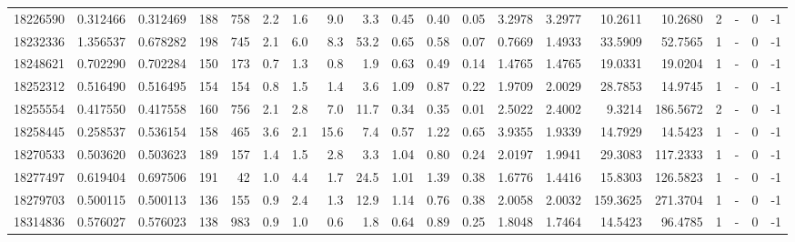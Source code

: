 \begin{tabular}{rrrrrrrrrrrrrrrrrlrl}
  18226590 & 0.312466 &   0.312469 &  188 &  758 &      2.2 &      1.6 &     9.0 &      3.3 &       0.45 &        0.40 &        0.05 &  3.2978 &  3.2977 &   10.2611 &   10.2680 &       2 &             - &        0 &        -1 \\
  18232336 & 1.356537 &   0.678282 &  198 &  745 &      2.1 &      6.0 &     8.3 &     53.2 &       0.65 &        0.58 &        0.07 &  0.7669 &  1.4933 &   33.5909 &   52.7565 &       1 &             - &        0 &        -1 \\
  18248621 & 0.702290 &   0.702284 &  150 &  173 &      0.7 &      1.3 &     0.8 &      1.9 &       0.63 &        0.49 &        0.14 &  1.4765 &  1.4765 &   19.0331 &   19.0204 &       1 &             - &        0 &        -1 \\
  18252312 & 0.516490 &   0.516495 &  154 &  154 &      0.8 &      1.5 &     1.4 &      3.6 &       1.09 &        0.87 &        0.22 &  1.9709 &  2.0029 &   28.7853 &   14.9745 &       1 &             - &        0 &        -1 \\
  18255554 & 0.417550 &   0.417558 &  160 &  756 &      2.1 &      2.8 &     7.0 &     11.7 &       0.34 &        0.35 &        0.01 &  2.5022 &  2.4002 &    9.3214 &  186.5672 &       2 &             - &        0 &        -1 \\
  18258445 & 0.258537 &   0.536154 &  158 &  465 &      3.6 &      2.1 &    15.6 &      7.4 &       0.57 &        1.22 &        0.65 &  3.9355 &  1.9339 &   14.7929 &   14.5423 &       1 &             - &        0 &        -1 \\
  18270533 & 0.503620 &   0.503623 &  189 &  157 &      1.4 &      1.5 &     2.8 &      3.3 &       1.04 &        0.80 &        0.24 &  2.0197 &  1.9941 &   29.3083 &  117.2333 &       1 &             - &        0 &        -1 \\
  18277497 & 0.619404 &   0.697506 &  191 &   42 &      1.0 &      4.4 &     1.7 &     24.5 &       1.01 &        1.39 &        0.38 &  1.6776 &  1.4416 &   15.8303 &  126.5823 &       1 &             - &        0 &        -1 \\
  18279703 & 0.500115 &   0.500113 &  136 &  155 &      0.9 &      2.4 &     1.3 &     12.9 &       1.14 &        0.76 &        0.38 &  2.0058 &  2.0032 &  159.3625 &  271.3704 &       1 &             - &        0 &        -1 \\
  18314836 & 0.576027 &   0.576023 &  138 &  983 &      0.9 &      1.0 &     0.6 &      1.8 &       0.64 &        0.89 &        0.25 &  1.8048 &  1.7464 &   14.5423 &   96.4785 &       1 &             - &        0 &        -1 \\

\end{tabular}
